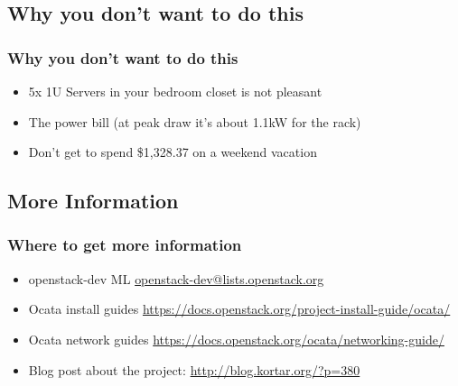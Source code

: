 \documentclass[aspectratio=169,11pt,hyperref={colorlinks=true}]{beamer}
\begin{document}
\subsection{Why you don't want to do this}
\begin{frame}
    \frametitle{Why you don't want to do this}
    \begin{itemize}
        \item 5x 1U Servers in your bedroom closet is not pleasant
        \item The power bill (at peak draw it's about 1.1kW for the rack)
        \item Don't get to spend \$1,328.37 on a weekend vacation
    \end{itemize}
\end{frame}


\subsection{More Information}
\begin{frame}
\frametitle{Where to get more information}
    \begin{itemize}
        \item openstack-dev ML\: \href{mailto:openstack-dev@lists.openstack.org}{openstack-dev@lists.openstack.org}
        \item Ocata install guides\: \href{https://docs.openstack.org/project-install-guide/ocata/}{https://docs.openstack.org/project-install-guide/ocata/}
        \item Ocata network guides\: \href{https://docs.openstack.org/ocata/networking-guide/}{https://docs.openstack.org/ocata/networking-guide/}
        \item Blog post about the project: \href{http://blog.kortar.org/?p=380}{http://blog.kortar.org/?p=380}
   \end{itemize}
\end{frame}
\end{document}
